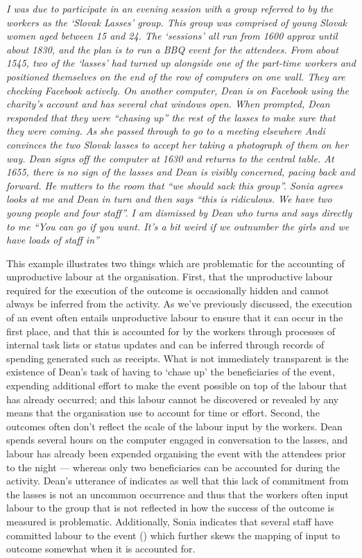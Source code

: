 \textit{I was due to participate in an evening session with a group referred to by the workers as the `Slovak Lasses' group. This group was comprised of young Slovak women aged between 15 and 24. The `sessions' all run from 1600 approx until about 1830, and the plan is to run a BBQ event for the attendees. From about 1545, two of the `lasses' had turned up alongside one of the part-time workers and positioned themselves on the end of the row of computers on one wall. They are checking Facebook actively. On another computer, Dean is on Facebook using the charity's account and has several chat windows open. When prompted, Dean responded that they were ``chasing up'' the rest of the lasses to make sure that they were coming. As she passed through to go to a meeting elsewhere Andi convinces the two Slovak lasses to accept her taking a photograph of them on her way. Dean signs off the computer at 1630 and returns to the central table. At 1655, there is no sign of the lasses and Dean is visibly concerned, pacing back and forward. He mutters to the room that ``we should sack this group''. Sonia agrees looks at me and Dean in turn and then says ``this is ridiculous. We have two young people and four staff''. I am dismissed by Dean who turns and says directly to me ``You can go if you want. It's a bit weird if we outnumber the girls and we have loads of staff in''}

This example illustrates two things which are problematic for the accounting of unproductive labour at the organisation. First, that the unproductive labour required for the execution of the outcome is occasionally hidden and cannot always be inferred from the activity. As we've previously discussed, the execution of an event often entails unproductive labour to ensure that it can occur in the first place, and that this is accounted for by the workers through processes of internal task lists or status updates and can be inferred through records of spending generated such as receipts. What is not immediately transparent is the existence of Dean's task of having to `chase up' the beneficiaries of the event, expending additional effort to make the event possible on top of the labour that has already occurred; and this labour cannot be discovered or revealed by any means that the organisation use to account for time or effort. Second, the outcomes often don't reflect the scale of the labour input by the workers. Dean spends several hours on the computer engaged in conversation to the lasses, and labour has already been expended organising the event with the attendees prior to the night --- whereas only two beneficiaries can be accounted for during the activity. Dean's utterance of  indicates as well that this lack of commitment from the lasses is not an uncommon occurrence and thus that the workers often input labour to the group that is not reflected in how the success of the outcome is measured is problematic. Additionally, Sonia indicates that several staff have committed labour to the event () which further skews the mapping of input to outcome somewhat when it is accounted for.

